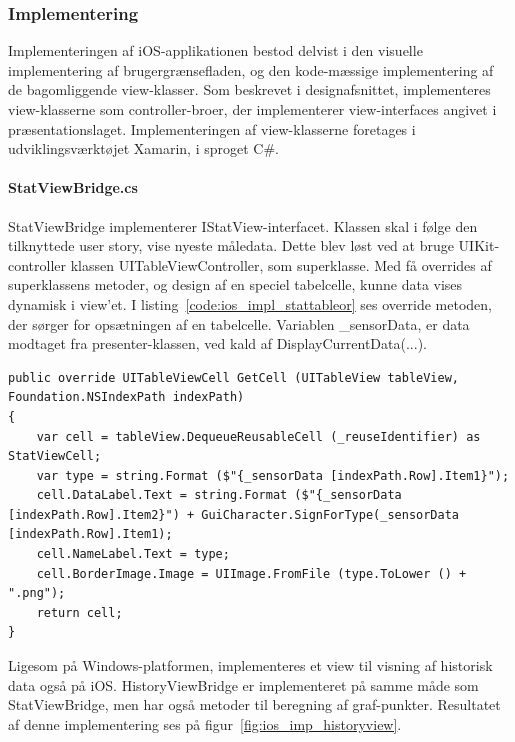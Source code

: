 \subsubsection{Implementering}
Implementeringen af iOS-applikationen bestod delvist i den visuelle implementering af brugergrænsefladen, og den kode-mæssige implementering af de bagomliggende view-klasser. Som beskrevet i designafsnittet, implementeres view-klasserne som controller-broer, der implementerer view-interfaces angivet i præsentationslaget. Implementeringen af view-klasserne foretages i udviklingsværktøjet Xamarin, i sproget C\#. 

\paragraph{StatViewBridge.cs}
StatViewBridge implementerer IStatView-interfacet. Klassen skal i følge den tilknyttede user story, vise nyeste måledata. Dette blev løst ved at bruge UIKit-controller klassen UITableViewController, som superklasse. Med få overrides af superklassens metoder, og design af en speciel tabelcelle, kunne data vises dynamisk i view'et. I listing~\ref{code:ios_impl_stattableor} ses override metoden, der sørger for opsætningen af en tabelcelle. Variablen \_sensorData, er data modtaget fra presenter-klassen, ved kald af DisplayCurrentData(...).

\begin{lstlisting}[caption={Override af UITableViewController-metoden GetCell},label={code:ios_impl_stattableor}]
public override UITableViewCell GetCell (UITableView tableView, Foundation.NSIndexPath indexPath)
{	
	var cell = tableView.DequeueReusableCell (_reuseIdentifier) as StatViewCell;
	var type = string.Format ($"{_sensorData [indexPath.Row].Item1}");
	cell.DataLabel.Text = string.Format ($"{_sensorData [indexPath.Row].Item2}") + GuiCharacter.SignForType(_sensorData [indexPath.Row].Item1);
	cell.NameLabel.Text = type;
	cell.BorderImage.Image = UIImage.FromFile (type.ToLower () + ".png");
	return cell;
}
\end{lstlisting}

Ligesom på Windows-platformen, implementeres et view til visning af historisk data også på iOS. HistoryViewBridge er implementeret på samme måde som StatViewBridge, men har også metoder til beregning af graf-punkter. Resultatet af denne implementering ses på figur~\ref{fig:ios_imp_historyview}.

